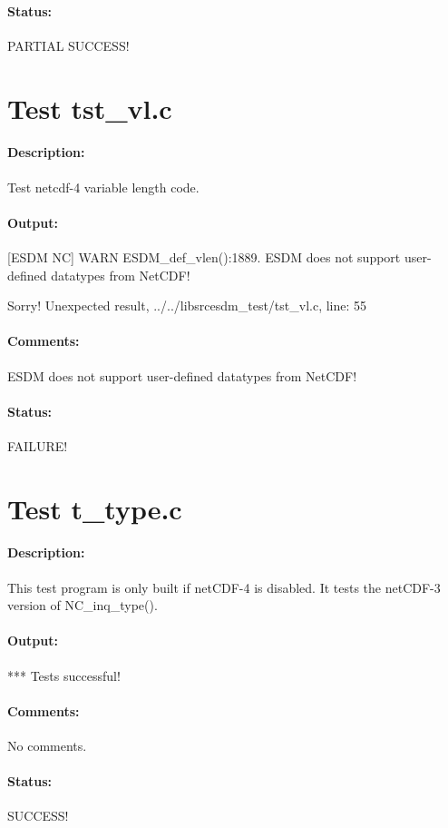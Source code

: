 \paragraph{Status:} PARTIAL SUCCESS!

\section{Test tst\_vl.c}

\paragraph{Description:} Test netcdf-4 variable length code.

\paragraph{Output:} [ESDM NC] WARN ESDM\_def\_vlen():1889. ESDM does not support user-defined datatypes from NetCDF!

Sorry! Unexpected result, ../../libsrcesdm\_test/tst\_vl.c, line: 55

\paragraph{Comments:} ESDM does not support user-defined datatypes from NetCDF!

\paragraph{Status:} FAILURE!

\section{Test t\_type.c}

\paragraph{Description:} This test program is only built if netCDF-4 is disabled. It tests
   the netCDF-3 version of NC\_inq\_type().

\paragraph{Output:} *** Tests successful!

\paragraph{Comments:} No comments.

\paragraph{Status:} SUCCESS!
